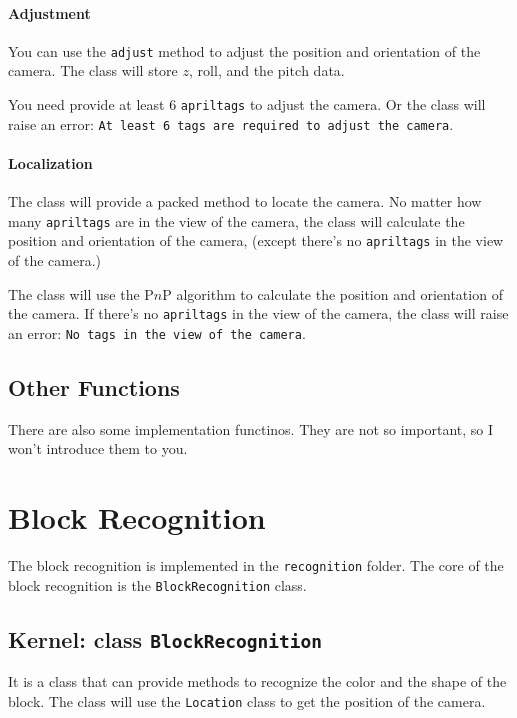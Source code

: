 \documentclass{article}
\begin{document}
\paragraph{Adjustment}

You can use the \texttt{adjust} method to adjust the position and orientation of the camera. The class will store $z$, $\mathrm{roll}$, and the $\mathrm{pitch}$ data.

You need provide at least $6$ \texttt{apriltags} to adjust the camera. Or the class will raise an error: \texttt{At least 6 tags are required to adjust the camera}.

\paragraph{Localization}

The class will provide a packed method to locate the camera. No matter how many \texttt{apriltags} are in the view of the camera, the class will calculate the position and orientation of the camera, (except there's no \texttt{apriltags} in the view of the camera.)

The class will use the P$n$P algorithm to calculate the position and orientation of the camera. If there's no \texttt{apriltags} in the view of the camera, the class will raise an error: \texttt{No tags in the view of the camera}.

\subsection{Other Functions}

There are also some implementation functinos. They are not so important, so I won't introduce them to you.

\section{Block Recognition}

The block recognition is implemented in the \texttt{recognition} folder. The core of the block recognition is the \texttt{BlockRecognition} class.

\subsection{Kernel: class \texttt{BlockRecognition}}

It is a class that can provide methods to recognize the color and the shape of the block. The class will use the \texttt{Location} class to get the position of the camera.
\end{document}
